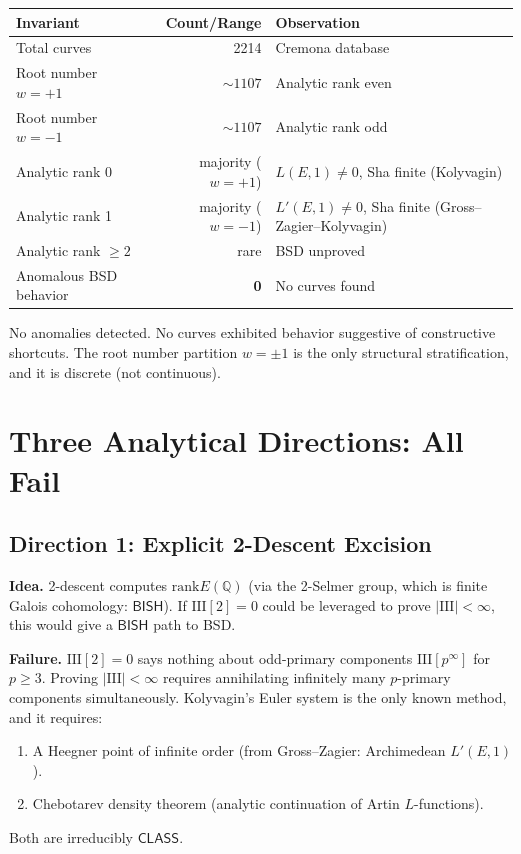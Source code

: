 \documentclass[11pt,a4paper]{article}
\theoremstyle{plain}
\theoremstyle{definition}
\newcommand{\BISH}{\textsf{BISH}}
\newcommand{\CLASS}{\textsf{CLASS}}
\newcommand{\Q}{\mathbb{Q}}
\newcommand{\Sha}{\mathrm{III}}
\newcommand{\rank}{\mathrm{rank}}
\begin{document}
\begin{center}
\begin{tabular}{@{}lrl@{}}
\toprule
\textbf{Invariant} & \textbf{Count/Range} & \textbf{Observation} \\
\midrule
Total curves & 2214 & Cremona database \\
Root number $w = +1$ & $\sim 1107$ & Analytic rank even \\
Root number $w = -1$ & $\sim 1107$ & Analytic rank odd \\
Analytic rank 0 & majority ($w = +1$) & $L(E,1) \neq 0$, Sha finite (Kolyvagin) \\
Analytic rank 1 & majority ($w = -1$) & $L'(E,1) \neq 0$, Sha finite (Gross--Zagier--Kolyvagin) \\
Analytic rank $\geq 2$ & rare & BSD unproved \\
Anomalous BSD behavior & \textbf{0} & No curves found \\
\bottomrule
\end{tabular}
\end{center}

No anomalies detected. No curves exhibited behavior suggestive of constructive shortcuts. The root number partition $w = \pm 1$ is the only structural stratification, and it is discrete (not continuous).

\section{Three Analytical Directions: All Fail}

\subsection{Direction 1: Explicit 2-Descent Excision}

\textbf{Idea.} 2-descent computes $\rank E(\Q)$ (via the 2-Selmer group, which is finite Galois cohomology: $\BISH$). If $\Sha[2] = 0$ could be leveraged to prove $|\Sha| < \infty$, this would give a $\BISH$ path to BSD.

\textbf{Failure.} $\Sha[2] = 0$ says nothing about odd-primary components $\Sha[p^\infty]$ for $p \geq 3$. Proving $|\Sha| < \infty$ requires annihilating infinitely many $p$-primary components simultaneously. Kolyvagin's Euler system is the only known method, and it requires:
\begin{enumerate}
\item[(a)] A Heegner point of infinite order (from Gross--Zagier: Archimedean $L'(E,1)$).
\item[(b)] Chebotarev density theorem (analytic continuation of Artin $L$-functions).
\end{enumerate}
Both are irreducibly $\CLASS$.
\end{document}
